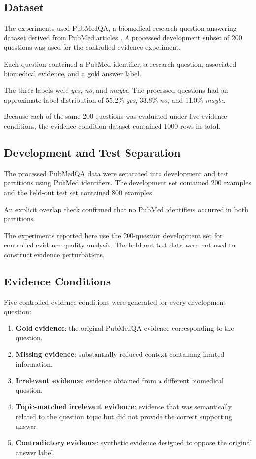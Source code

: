 \documentclass[conference]{IEEEtran}
\begin{document}
\subsection{Dataset}

The experiments used PubMedQA, a biomedical research question-answering dataset derived from PubMed articles \cite{jin2019pubmedqa}. A processed development subset of 200 questions was used for the controlled evidence experiment.

Each question contained a PubMed identifier, a research question, associated biomedical evidence, and a gold answer label.

The three labels were \textit{yes}, \textit{no}, and \textit{maybe}. The processed questions had an approximate label distribution of 55.2\% \textit{yes}, 33.8\% \textit{no}, and 11.0\% \textit{maybe}.

Because each of the same 200 questions was evaluated under five evidence conditions, the evidence-condition dataset contained 1000 rows in total.

\subsection{Development and Test Separation}

The processed PubMedQA data were separated into development and test partitions using PubMed identifiers. The development set contained 200 examples and the held-out test set contained 800 examples.

An explicit overlap check confirmed that no PubMed identifiers occurred in both partitions.

The experiments reported here use the 200-question development set for controlled evidence-quality analysis. The held-out test data were not used to construct evidence perturbations.

\subsection{Evidence Conditions}

Five controlled evidence conditions were generated for every development question:

\begin{enumerate}
    \item \textbf{Gold evidence}: the original PubMedQA evidence corresponding to the question.
    \item \textbf{Missing evidence}: substantially reduced context containing limited information.
    \item \textbf{Irrelevant evidence}: evidence obtained from a different biomedical question.
    \item \textbf{Topic-matched irrelevant evidence}: evidence that was semantically related to the question topic but did not provide the correct supporting answer.
    \item \textbf{Contradictory evidence}: synthetic evidence designed to oppose the original answer label.
\end{enumerate}
\end{document}
